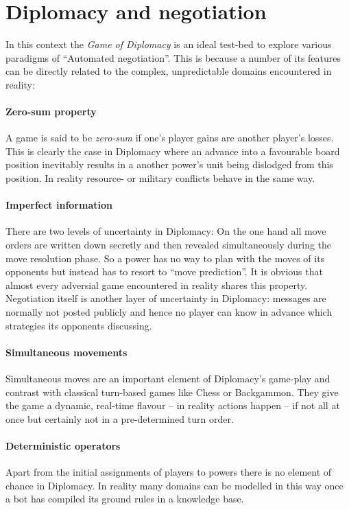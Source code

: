 \documentclass[pdftex,12pt,a4paper]{report}
\begin{document}
\section{Diplomacy and negotiation}

In this context the \textit{Game of Diplomacy} is an ideal test-bed 
to explore various paradigms of ``Automated negotiation''. This is because
a number of its features can be directly related to the complex, unpredictable
domains encountered in reality: 

\paragraph{Zero-sum property}
A game is said to be \textit{zero-sum} if one's player gains are another
player's losses. This is clearly the case in Diplomacy where an advance
into a favourable board position inevitably results in a another power's
unit being dislodged from this position. In reality resource- or
military conflicts behave in the same way.

\paragraph{Imperfect information}
There are two levels of uncertainty in Diplomacy: On the one hand all move
orders are written down secretly and then revealed simultaneously during
the move resolution phase. So a power has no way to plan with the moves 
of its opponents but instead has to resort to ``move prediction''. It
is obvious that almost every adversial game encountered in reality
shares this property. Negotiation itself is another
layer of uncertainty in Diplomacy: messages are normally not 
posted publicly and hence no player can know in advance which
strategies its opponents discussing.

\paragraph{Simultaneous movements} 
Simultaneous moves are an important element of Diplomacy's game-play
and contrast with classical turn-based games like Chess or 
Backgammon. They give the game a dynamic, real-time flavour -- 
in reality actions happen -- if not all at once but certainly
not in a pre-determined turn order.

\paragraph{Deterministic operators}
Apart from the initial assignments of players to powers there
is no element of chance in Diplomacy. In reality many domains
can be modelled in this way once a bot has compiled its ground
rules in a knowledge base.
\end{document}

